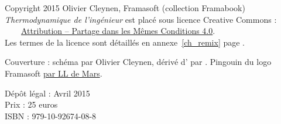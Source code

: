 \begin{titlepage}
\begin{center}
		\noindent Copyright 2015 Olivier Cleynen, Framasoft (collection Framabook)\\
		\textit{Thermodynamique de l’ingénieur} est placé sous licence Creative Commons :\\
		\ccLogo\ \ccAttribution\ \ccShareAlike \ \ \href{https://creativecommons.org/licenses/by-sa/4.0/deed.fr}{Attribution -- Partage dans les Mêmes Conditions 4.0}.\\
		Les termes de la licence sont détaillés en annexe~\ref{ch_remix} page \pageref{ch_remix}.

		{\footnotesize Couverture : schéma \ccbysa par Olivier Cleynen, dérivé d’ \ccbysa par . Pingouin du logo Framasoft \lal \href{http://www.le-terrier.net/pingouin/pingouin.html}{par LL de Mars}.\par}

		\noindent Dépôt légal : Avril 2015\\
		Prix : 25 euros\\
		ISBN : 979-10-92674-08-8
\end{center}


\end{titlepage}
\pagestyle{fancy}\restoregeometry
